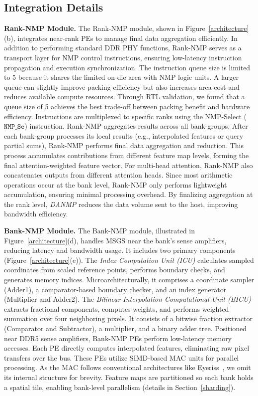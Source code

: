 \documentclass[sigconf]{acmart}
\begin{document}
\subsection{Integration Details}
\label{integration_detail}


{\bf Rank-NMP Module.} The Rank-NMP module, shown in Figure~\ref{architecture}(b), integrates near-rank PEs to manage final data aggregation efficiently. In addition to performing standard DDR PHY functions, Rank-NMP serves as a transport layer for NMP control instructions, ensuring low-latency instruction propagation and execution synchronization. {The instruction queue size is limited to 5 because it shares the limited on-die area with NMP logic units. A larger queue can slightly improve packing efficiency but also increases area cost and reduces available compute resources. Through RTL validation, we found that a queue size of 5 achieves the best trade-off between packing benefit and hardware efficiency.} Instructions are multiplexed to specific ranks using the NMP-Select ($\mathtt{NMP\_Se}$) instruction. Rank-NMP aggregates results across all bank-groups. After each bank-group processes its local results (e.g., interpolated features or query partial sums), Rank-NMP performs final data aggregation and reduction. This process accumulates contributions from different feature map levels, forming the final attention-weighted feature vector. For multi-head attention, Rank-NMP also concatenates outputs from different attention heads. Since most arithmetic operations occur at the bank level, Rank-NMP only performs lightweight accumulation, ensuring minimal processing overhead. By finalizing aggregation at the rank level, \textit{DANMP} reduces the data volume sent to the host, improving bandwidth efficiency.


{\bf Bank-NMP Module.} The Bank-NMP module, illustrated in Figure~\ref{architecture}(d), handles MSGS near the bank's sense amplifiers, reducing latency and bandwidth usage. {It includes two primary components (Figure~\ref{architecture}(e)).} The \textit{Index Computation Unit (ICU)} calculates sampled coordinates from scaled reference points, performs boundary checks, and generates memory indices. Microarchitecturally, it comprises a coordinate sampler (Adder1), a comparator-based boundary checker, and an index generator (Multiplier and Adder2). The \textit{Bilinear Interpolation Computational Unit (BICU)} extracts fractional components, computes weights, and performs weighted summation over four neighboring pixels. It consists of a bitwise fraction extractor (Comparator and Subtractor), a multiplier, and a binary adder tree. Positioned near DDR5 sense amplifiers, Bank-NMP PEs perform low-latency memory accesses. Each PE directly computes interpolated features, eliminating raw pixel transfers over the bus. These PEs utilize SIMD-based MAC units for parallel processing. {As the MAC follows conventional architectures like Eyeriss~\cite{chen2016eyeriss}, we omit its internal structure for brevity.} Feature maps are partitioned so each bank holds a spatial tile, enabling bank-level parallelism (details in Section~\ref{sharding}).
\end{document}
